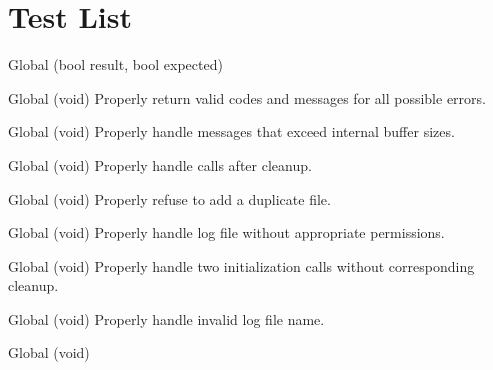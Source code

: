 \chapter{Test List}
\hypertarget{test}{}\label{test}

\begin{DoxyRefList}
\item[Global \doxylink{tests_8h_a0302d7265a4074f6dedcc65495123fe6}{print\+\_\+test\+\_\+error} (bool result, bool expected)]\label{test__test000023}%
%
 
\item[Global \doxylink{group__tests_ga1d9150c929ba0b79bf06592563ea81e1}{sirtest\+\_\+errorsanity} (void)]\label{test__test000016}%
%
Properly return valid codes and messages for all possible errors.  
\item[Global \doxylink{group__tests_ga90b7633a39946d2c201758aafbce43fa}{sirtest\+\_\+exceedmaxsize} (void)]\label{test__test000002}%
%
Properly handle messages that exceed internal buffer sizes.  
\item[Global \doxylink{group__tests_gabf5a4643e79df2f6b06956ffd6a465ab}{sirtest\+\_\+failaftercleanup} (void)]\label{test__test000011}%
%
Properly handle calls after cleanup.  
\item[Global \doxylink{group__tests_ga33eca3443a7a02e5fdaf97f8cb2158a1}{sirtest\+\_\+faildupefile} (void)]\label{test__test000013}%
%
Properly refuse to add a duplicate file.  
\item[Global \doxylink{group__tests_ga8f5266c274182a3dae54c48d8d8abba1}{sirtest\+\_\+failfilebadpermission} (void)]\label{test__test000007}%
%
Properly handle log file without appropriate permissions.  
\item[Global \doxylink{group__tests_gaf38b29b3f35da81c5315f110745f360d}{sirtest\+\_\+failinittwice} (void)]\label{test__test000010}%
%
Properly handle two initialization calls without corresponding cleanup.  
\item[Global \doxylink{group__tests_ga8d74e7810b41d505863eddced156f448}{sirtest\+\_\+failinvalidfilename} (void)]\label{test__test000006}%
%
Properly handle invalid log file name.  
\item[Global \doxylink{group__tests_ga9472cbb9a62d343fe0272444a7f87ce1}{sirtest\+\_\+failnooutputdest} (void)]\label{test__test000005}%

\end{DoxyRefList}
